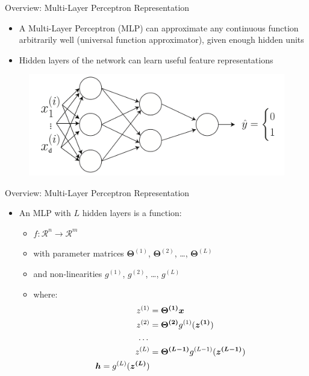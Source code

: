 \begin{frame}{Overview: Multi-Layer Perceptron Representation}{}
	\begin{itemize}
		\item A Multi-Layer Perceptron (MLP) can approximate any continuous function arbitrarily well (universal function approximator), given enough hidden units
		\item Hidden layers of the network can learn useful feature representations
	\end{itemize}
	\begin{figure}
		\centering
		\includegraphics[scale=0.45]{10_deep_learning/02_img/mlp}
	\end{figure}
\end{frame}

\begin{frame}{Overview: Multi-Layer Perceptron Representation}{}
	\begin{itemize}
		\item An MLP with $L$ hidden layers is a function:
		\begin{itemize}
			\item $f: \mathcal{R}^n \rightarrow \mathcal{R}^m$
			\item with parameter matrices $\bm{\Theta}^{(1)}$, $\bm{\Theta}^{(2)}$, \dots, $\bm{\Theta}^{(L)}$
			\item and non-linearities $g^{(1)}$, $g^{(2)}$, \dots, $g^{(L)}$
			\item where:
			\begin{align*}
				z^{(1)} &= \bm{\Theta^{(1)}} \bm{x}\\
				z^{(2)} &= \bm{\Theta^{(2)}} g^{(1)}(\bm{z^{(1)}})\\
				\text{\dots}\\
				z^{(L)} &= \bm{\Theta^{(L-1)}} g^{(L-1)}(\bm{z^{(L-1)}})\\
				\bm{h} = g^{(L)}(\bm{z^{(L)}})
			\end{align*}
		\end{itemize}
	\end{itemize}
\end{frame}

